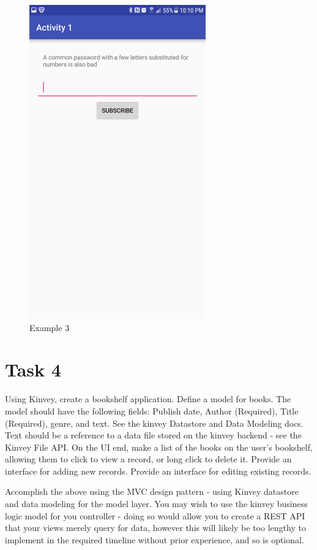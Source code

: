 \documentclass{article}
\begin{document}
\begin{figure}[ht]
      \includegraphics[width=3in]{img/t3s3.png}
      \centering
      \caption{Example 3}
\end{figure}

\clearpage
\section{Task 4}
Using Kinvey, create a bookshelf application.
Define a model for books.
The model should have the following fields: Publish date, Author (Required), Title (Required), genre, and text. See the kinvey Datastore and Data Modeling docs. 
Text should be a reference to a data file stored on the kinvey backend - see the Kinvey File API.
On the UI end, make a list of the books on the user's bookshelf, allowing them to click to view a record, or long click to delete it.
Provide an interface for adding new records.
Provide an interface for editing existing records.

Accomplish the above using the MVC design pattern - using Kinvey datastore and data modeling for the model layer.
You may wish to use the kinvey business logic model for you controller - doing so would allow you to create a REST API that your views merely query for data, however this will likely be too lengthy to implement in the required timeline without prior experience, and so is optional.
\end{document}
